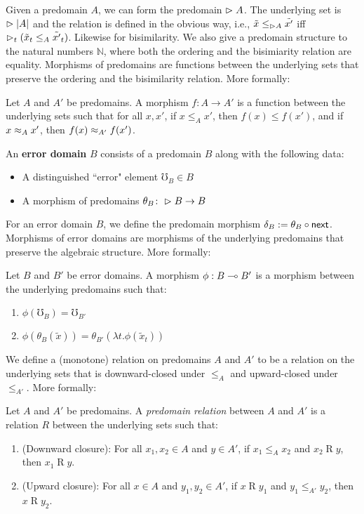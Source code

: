 Given a predomain $A$, we can form the predomain $\vartriangleright A$.
The underlying set is $\vartriangleright |A|$ and the relation is defined in the obvious way,
i.e., $\tilde{x} \le_{\vartriangleright A} \tilde{x'}$ iff $\vartriangleright_t(\tilde{x}_t \le_A \tilde{x'}_t)$.
Likewise for bisimilarity.
%
We also give a predomain structure to the natural numbers $\mathbb{N}$, where both the
ordering and the bisimiarity relation are equality.
%
Morphisms of predomains are functions between the underlying sets that preserve the ordering
and the bisimilarity relation. More formally:
%
\begin{definition}
Let $A$ and $A'$ be predomains.
A morphism $f : A \to A'$ is a function between the underlying sets such that for all $x, x'$,
if $x \le_A x'$, then $f(x) \le f(x')$, and if $x \approx_A x'$, then $f(x) \approx_{A'} f(x')$.
\end{definition}
%
\begin{definition}
An \textbf{error domain} $B$ consists of a predomain $B$ along with the following data:
\begin{itemize}
    \item A distinguished ``error" element $\mho_B \in B$
    \item A morphism of predomains $\theta_B \colon \vartriangleright B \to B$
\end{itemize}
\end{definition}
%
For an error domain $B$, we define the predomain morphism $\delta_B := \theta_B \circ \mathsf{next}$.
%
Morphisms of error domains are morphisms of the underlying predomains that preserve the
algebraic structure. More formally:
%
\begin{definition}
Let $B$ and $B'$ be error domains.
A morphism $\phi : B \mathrel{\multimap} B'$ is a morphism between the underlying predomains such that:
\begin{enumerate}
    \item $\phi(\mho_B) = \mho_{B'}$
    \item $\phi(\theta_B(\tilde{x})) = \theta_{B'}(\lambda t. \phi(\tilde{x}_t))$
\end{enumerate}
\end{definition}
%
We define a (monotone) relation on predomains $A$ and $A'$ to be a relation on the
underlying sets that is downward-closed under $\le_A$ and upward-closed under $\le_{A'}$.
More formally:
%
\begin{definition}
Let $A$ and $A'$ be predomains. A \emph{predomain relation} between $A$ and $A'$
is a relation $R$ between the underlying sets such that:
\begin{enumerate}
    \item (Downward closure): For all $x_1, x_2 \in A$ and $y \in A'$,
    if $x_1 \le_A x_2$ and $x_2 \mathbin{R} y$, then $x_1 \mathbin{R} y$.
    \item (Upward closure): For all $x \in A$ and $y_1, y_2 \in A'$,
    if $x \mathbin{R} y_1$ and $y_1 \le_{A'} y_2$, then $x \mathbin{R} y_2$.
\end{enumerate}
\end{definition}
